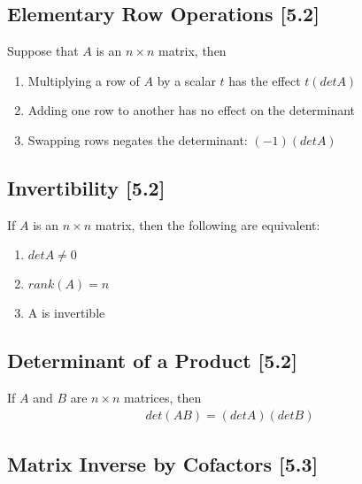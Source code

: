 \documentclass[a4paper,9pt]{extarticle}
\begin{document}
\begin{multicols*}{2}

\subsection{Elementary Row Operations [5.2]}
Suppose that $A$ is an $n \times n$ matrix, then
\begin{enumerate}[label=\bfseries (\arabic*)] \itemsep0pt \parskip0pt 
    \item Multiplying a row of $A$ by a scalar $t$ has the effect $t(det A)$
    \item Adding one row to another has no effect on the determinant
    \item Swapping rows negates the determinant: $(-1)(det A)$
\end{enumerate}


\subsection{Invertibility [5.2]}
If $A$ is an $n \times n$ matrix, then the following are equivalent:
\begin{enumerate}[label=\bfseries (\arabic*)] \itemsep0pt \parskip0pt 
    \item $det A \neq 0$
    \item $rank(A) = n$
    \item A is invertible
\end{enumerate}


\subsection{Determinant of a Product [5.2]}
If $A$ and $B$ are $n \times n$ matrices, then
\begin{equation} \label{5.2-1}
    \begin{split}
        det(AB) = (det A)(det B)
    \end{split}
\end{equation}


\subsection{Matrix Inverse by Cofactors [5.3]}


\end{multicols*}
\end{document}
